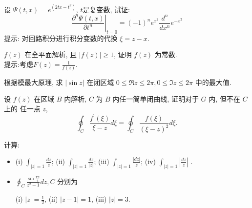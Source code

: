\documentclass[10pt]{article}
\newenvironment{problem}[2][]{\begin{trivlist}
\item[\hskip \labelsep {\bfseries #1}\hskip \labelsep {\bfseries #2}]}{\end{trivlist}}
\begin{document}
\renewcommand{\labelenumi}{(\arabic{enumi})}
\renewcommand{\labelenumii}{(\arabic{enumi}.\arabic{enumii})}



 


\begin{problem}{3.1}
  设 $\Psi(t, x)=e^{ \left(2 t x-t^2\right)}$, $t$是复变数, 试证: 
  $$
  \left.\frac{\partial^n \Psi(t, x)}{\partial t^n}\right|_{t=0}=(-1)^n e^{x^2} \frac{d^n}{d x^n} e^{-x^2}
  $$
  提示: 对回路积分进行积分变数的代换 $\xi=z-x$.
\end{problem}

\begin{problem}{3.2}
  $f(z)$ 在全平面解析, 且 $|f(z)| \geq 1$, 证明 $f(z)$ 为常数.
  \\
  提示:考虑$F(z) = \frac{1}{f(z)}$.
\end{problem}

\begin{problem}{3.3}
  根据模最大原理,
  求 $|\sin z|$ 在闭区域 $0 \leq \Re z \leq 2 \pi, 0 \leq \Im z \leq 2 \pi$ 中的最大值.
\end{problem}

\begin{problem}{3.4}
  设 $f(z)$ 在区域 $B$ 内解析, $C$ 为 $B$ 内任一简单闭曲线, 证明对于 $G$ 内, 
  但不在 $C$ 上的 任一点 $z$, 
  $$
  \oint_C \frac{f^{\prime}(\xi)}{\xi-z} d \xi=\oint_C \frac{f(\xi)}{(\xi-z)^2} d \xi.
  $$ 
  \end{problem}


  
\begin{problem}{3.5}
  计算:
  \begin{itemize}
    \item 
    (i) $\int_{|z|=1} \frac{d z}{z}$;
    (ii) $\int_{|z|=1} \frac{d z}{|z|}$;
    (iii) $\int_{|z|=1} \frac{|d z|}{z}$;
    (iv) $\int_{|z|=1}\left|\frac{d z}{z}\right|$ .

    \item  $\oint_C \frac{\sin \frac{\pi z}{4}}{z^2-1} d z, C$ 分别为

    (i) $|z|=\frac{1}{2}$,
    (ii) $|z-1|=1$,
    (iii) $|z|=3$.
    
  \end{itemize}

\end{problem}
\end{document}
